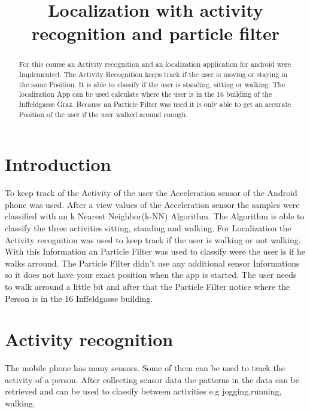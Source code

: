 \documentclass[conference]{IEEEtran}
\begin{document}
\title{Localization with activity recognition and particle filter\\}

\author{
\and
{}
}

\maketitle

\begin{abstract}
For this course an Activity recognition and an localization application for android were Implemented. The Activity Recognition keeps track if the user is moving or staying in the same Position. It is able to classify if the user is standing, sitting or walking. The localization App can be used calculate where the user is in the 16 building of the Inffeldgasse Graz. Because an Particle Filter was used it is only able to get an accurate Position of the user if the user walked around enough.
\end{abstract}

\section{Introduction}
To keep track of the Activity of the user the Acceleration sensor of the Android phone was used. After a view values of the Acceleration sensor the samples were classified with an k Nearest Neighbor(k-NN) Algorithm. The Algorithm is able to classify the three activities sitting, standing and walking. For Localization the Activity recognition was used to keep track if the user is walking or not walking. With this Information an Particle Filter was used to classify were the user is if he walks arround. The Particle Filter didn't use any additional sensor Informations so it does not have your exact   position when the app is started. The user needs to walk arround a little bit and after that the Particle Filter notice where the Person is in the 16 Inffeldgasse building.

\section{Activity recognition}
The mobile phone has many sensors. Some of them can be used to track the activity of a person.  After collecting sensor data the patterns in the data can be retrieved and can be used to classify between activities e.g jogging,running, walking.
\end{document}
